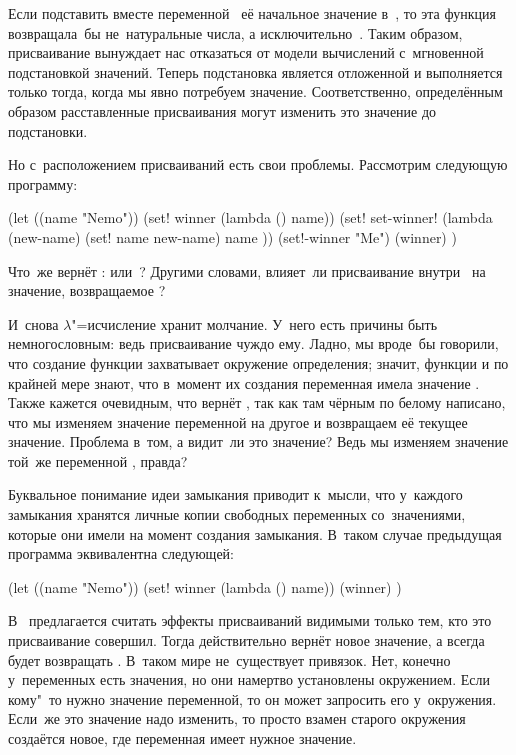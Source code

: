 Если подставить вместе переменной~ её начальное значение в~,
то эта функция возвращала~бы не~натуральные числа, а исключительно~.
Таким образом, присваивание вынуждает нас отказаться от модели вычислений
с~мгновенной подстановкой значений. Теперь подстановка является отложенной и
выполняется только тогда, когда мы явно потребуем значение. Соответственно,
определённым образом расставленные присваивания могут изменить это значение до
подстановки.

Но с~расположением присваиваний есть свои проблемы. Рассмотрим следующую
программу:

\begin{code:lisp}
(let ((name "Nemo"))
  (set! winner (lambda () name))
  (set! set-winner! (lambda (new-name) (set! name new-name)
                                       name ))
  (set!-winner "Me")
  (winner) )
\end{code:lisp}

Что~же вернёт :  или~? Другими словами,
влияет~ли присваивание внутри~ на значение, возвращаемое
?

И~снова $\lambda$"=исчисление хранит молчание. У~него есть причины быть
немногословным: ведь присваивание чуждо ему. Ладно, мы вроде~бы говорили, что
создание функции захватывает окружение определения; значит, функции 
и  по крайней мере знают, что в~момент их создания переменная
 имела значение . Также кажется очевидным, что
 вернёт , так как там чёрным по белому написано,
что мы изменяем значение переменной  на другое и возвращаем её текущее
значение. Проблема в~том, а видит~ли  это значение? Ведь мы изменяем
значение той~же переменной , правда?

Буквальное понимание идеи замыкания приводит к~мысли, что у~каждого замыкания
хранятся личные копии свободных переменных со~значениями, которые они имели на
момент создания замыкания. В~таком случае предыдущая программа эквивалентна
следующей:

\begin{code:lisp}
(let ((name "Nemo"))
  (set! winner (lambda () name))
  (winner) )
\end{code:lisp}

В~\cite{sam79} предлагается считать эффекты присваиваний видимыми только тем,
кто это присваивание совершил. Тогда действительно  вернёт новое
значение, а  всегда будет возвращать . В~таком мире
не~существует привязок. Нет, конечно у~переменных есть значения, но они намертво
установлены окружением. Если кому"~то нужно значение переменной, то он может
запросить его у~окружения. Если~же это значение надо изменить, то просто взамен
старого окружения создаётся новое, где переменная имеет нужное значение.

